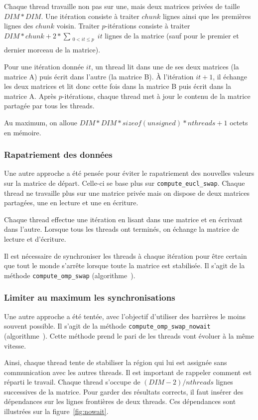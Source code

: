 Chaque thread travaille non pas sur une, mais deux matrices privées de
taille $DIM*DIM$. Une itération consiste à traiter $chunk$ lignes
ainsi que les premières lignes des $chunk$ voisin. Traiter
$p$-itérations consiste à traiter
$DIM*chunk+2*\sum_{\substack{0<it\leq p \\}}it$ lignes de la matrice
(sauf pour le premier et dernier morceau de la matrice).

Pour une itération donnée $it$, un thread lit dans
une de ses deux matrices (la matrice A) puis écrit dans l'autre (la
matrice B). À l'itération $it+1$, il échange les deux matrices et lit
donc cette fois dans la matrice B puis écrit dans la matrice A. Après
$p$-itérations, chaque thread met à jour le contenu de la matrice
partagée par tous les threads.

Au maximum, on alloue $DIM*DIM*sizeof(unsigned)*nthreads+1$ octets en
mémoire.


\subsubsection{Rapatriement des données}

Une autre approche a été pensée pour éviter le rapatriement des
nouvelles valeurs sur la matrice de départ. Celle-ci se base plus
sur \texttt{compute\_eucl\_swap}. Chaque thread ne travaille plus sur
une matrice privée mais on dispose de deux matrices partagées, une en
lecture et une en écriture.

Chaque thread effectue une itération en lisant dans une matrice et en
écrivant dans l'autre. Lorsque tous les threads ont terminés, on
échange la matrice de lecture et d'écriture.

Il est nécessaire de synchroniser les threads à chaque itération pour
être certain que tout le monde s'arrête lorsque toute la matrice est
stabilisée. Il s'agit de la méthode \texttt{compute\_omp\_swap} (algorithme~).
\medskip

\subsubsection{Limiter au maximum les synchronisations}

Une autre approche a été tentée, avec l'objectif d'utiliser des
barrières le moins souvent possible. Il s'agit de la méthode
\texttt{compute\_omp\_swap\_nowait} (algorithme~). Cette méthode prend
le pari de les threads vont évoluer à la même vitesse.
\medskip

Ainsi, chaque thread tente de stabiliser la région qui lui est
assignée sans communication avec les autres threads. Il est important
de rappeler comment est réparti le travail. Chaque thread s'occupe de
$(DIM-2)/nthreads$ lignes successives de la matrice. Pour garder des
résultats corrects, il faut insérer des dépendances sur les lignes
frontières de deux threads. Ces dépendances sont illustrées sur la
figure~\ref{fig:nowait}.
\medskip

